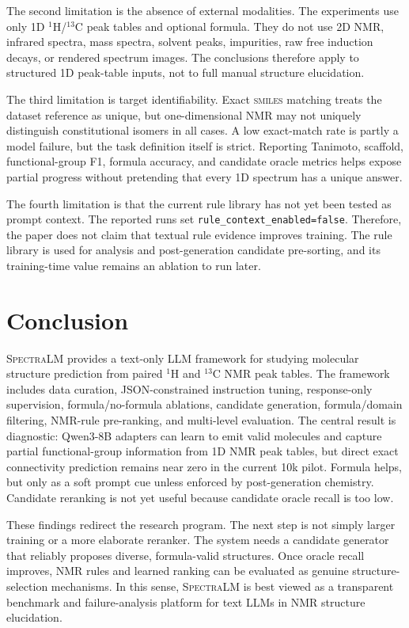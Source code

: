 \documentclass{article}
\newcommand{\smiles}{\textsc{smiles}}
\newcommand{\spectralm}{\textsc{SpectraLM}}
\begin{document}
The second limitation is the absence of external modalities. The experiments use only 1D \(^{1}\)H/\(^{13}\)C peak tables and optional formula. They do not use 2D NMR, infrared spectra, mass spectra, solvent peaks, impurities, raw free induction decays, or rendered spectrum images. The conclusions therefore apply to structured 1D peak-table inputs, not to full manual structure elucidation.

The third limitation is target identifiability. Exact \smiles{} matching treats the dataset reference as unique, but one-dimensional NMR may not uniquely distinguish constitutional isomers in all cases. A low exact-match rate is partly a model failure, but the task definition itself is strict. Reporting Tanimoto, scaffold, functional-group F1, formula accuracy, and candidate oracle metrics helps expose partial progress without pretending that every 1D spectrum has a unique answer.

The fourth limitation is that the current rule library has not yet been tested as prompt context. The reported runs set \texttt{rule\_context\_enabled=false}. Therefore, the paper does not claim that textual rule evidence improves training. The rule library is used for analysis and post-generation candidate pre-sorting, and its training-time value remains an ablation to run later.

\section{Conclusion}

\spectralm{} provides a text-only LLM framework for studying molecular structure prediction from paired \(^{1}\)H and \(^{13}\)C NMR peak tables. The framework includes data curation, JSON-constrained instruction tuning, response-only supervision, formula/no-formula ablations, candidate generation, formula/domain filtering, NMR-rule pre-ranking, and multi-level evaluation. The central result is diagnostic: Qwen3-8B adapters can learn to emit valid molecules and capture partial functional-group information from 1D NMR peak tables, but direct exact connectivity prediction remains near zero in the current 10k pilot. Formula helps, but only as a soft prompt cue unless enforced by post-generation chemistry. Candidate reranking is not yet useful because candidate oracle recall is too low.

These findings redirect the research program. The next step is not simply larger training or a more elaborate reranker. The system needs a candidate generator that reliably proposes diverse, formula-valid structures. Once oracle recall improves, NMR rules and learned ranking can be evaluated as genuine structure-selection mechanisms. In this sense, \spectralm{} is best viewed as a transparent benchmark and failure-analysis platform for text LLMs in NMR structure elucidation.
\end{document}
